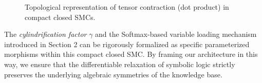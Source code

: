 \documentclass[runningheads]{llncs}
\begin{document}
\begin{figure}[h]
	\centering
	\caption{Topological representation of tensor contraction (dot product) in compact closed SMCs.}
	\label{fig:cup-cap}
\end{figure}

The \textit{cylindrification factor} $\gamma$ and the Softmax-based variable loading mechanism introduced in Section 2 can be rigorously formalized as specific parameterized morphisms within this compact closed SMC. By framing our architecture in this way, we ensure that the differentiable relaxation of symbolic logic strictly preserves the underlying algebraic symmetries of the knowledge base.

\printbibliography
\end{document}
